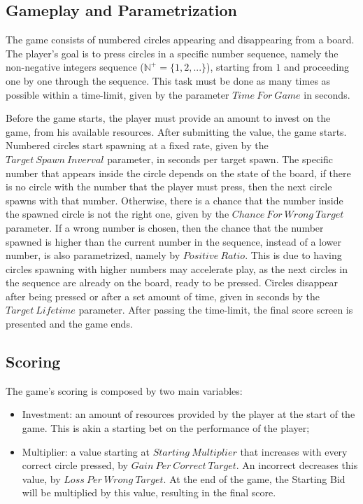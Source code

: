 \subsection{Gameplay and Parametrization} 
The game consists of numbered circles appearing and disappearing from a board. The player's goal is to press circles in a specific number sequence, namely the non-negative integers sequence ($\mathbb{N}^+ = \{1, 2, ...\}$), starting from $1$ and proceeding one by one through the sequence. This task must be done as many times as possible within a time-limit, given by the parameter $Time\ For\ Game$ in seconds.

Before the game starts, the player must provide an amount to invest on the game, from his available resources. After submitting the value, the game starts. Numbered circles start spawning at a fixed rate, given by the $Target\ Spawn\ Inverval$ parameter, in seconds per target spawn. The specific number that appears inside the circle depends on the state of the board, if there is no circle with the number that the player must press, then the next circle spawns with that number. Otherwise, there is a chance that the number inside the spawned circle is not the right one, given by the $Chance\ For\ Wrong\ Target$ parameter. If a wrong number is chosen, then the chance that the number spawned is higher than the current number in the sequence, instead of a lower number, is also parametrized, namely by $Positive\ Ratio$. This is due to having circles spawning with higher numbers may accelerate play, as the next circles in the sequence are already on the board, ready to be pressed. Circles disappear after being pressed or after a set amount of time, given in seconds by the $Target\ Lifetime$ parameter. After passing the time-limit, the final score screen is presented and the game ends.


\subsection{Scoring}
\label{subsec:Scoring}
The game's scoring is composed by two main variables:
\begin{itemize}
    \item Investment: an amount of resources provided by the player at the start of the game. This is akin a starting bet on the performance of the player; 
    \item Multiplier: a value starting at $Starting\ Multiplier$ that increases with every correct circle pressed, by $Gain\ Per\ Correct\ Target$. An incorrect decreases this value, by $Loss\ Per\ Wrong\ Target$. At the end of the game, the Starting Bid will be multiplied by this value, resulting in the final score.
\end{itemize}

